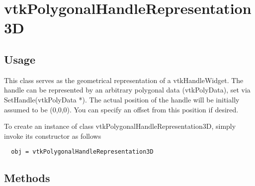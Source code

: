 \section{vtkPolygonalHandleRepresentation3D}

\subsection{Usage}

 This class serves as the geometrical representation of a vtkHandleWidget. 
 The handle can be represented by an arbitrary polygonal data (vtkPolyData),
 set via SetHandle(vtkPolyData *). The actual position of the handle 
 will be initially assumed to be (0,0,0). You can specify an offset from
 this position if desired.

To create an instance of class vtkPolygonalHandleRepresentation3D, simply
invoke its constructor as follows
\begin{verbatim}
  obj = vtkPolygonalHandleRepresentation3D
\end{verbatim}
\subsection{Methods}

